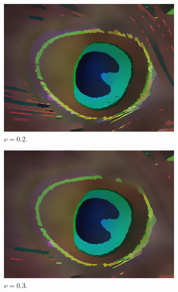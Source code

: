 \documentclass[abstracton]{scrreprt}
\begin{document}
\begin{figure}[!ht]
\begin{subfigure}[b]{0.16\textwidth}
                    \includegraphics[width=\textwidth]{img/segmentation/rt/02peacock-feather.png}
                    \caption{$\nu = 0.2$.}
                \end{subfigure}
                \begin{subfigure}[b]{0.16\textwidth}
                    \includegraphics[width=\textwidth]{img/segmentation/rt/03peacock-feather.png}
                    \caption{$\nu = 0.3$.}
                \end{subfigure}
                \begin{subfigure}[b]{0.16\textwidth}

\end{subfigure}
\end{figure}
\end{document}
